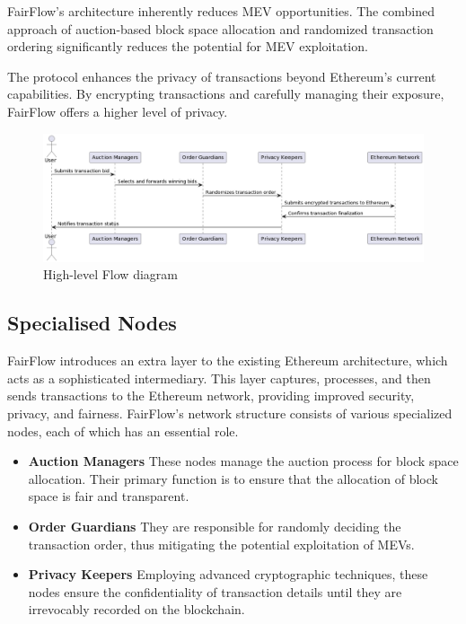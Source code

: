 \documentclass{article}
\begin{document}
FairFlow's architecture inherently reduces MEV opportunities. The combined approach of auction-based block space allocation and randomized transaction ordering significantly reduces the potential for MEV exploitation.

The protocol enhances the privacy of transactions beyond Ethereum's current capabilities. By encrypting transactions and carefully managing their exposure, FairFlow offers a higher level of privacy.

\begin{figure}[h]
    \centering
    \includegraphics[width=0.8\linewidth]{diagram_freeflow_3.png}
    \caption{High-level Flow diagram}
    \label{fig:enter-label}
\end{figure}

\subsection{Specialised Nodes}

FairFlow introduces an extra layer to the existing Ethereum architecture, which acts as a sophisticated intermediary. This layer captures, processes, and then sends transactions to the Ethereum network, providing improved security, privacy, and fairness. FairFlow's network structure consists of various specialized nodes, each of which has an essential role.

\begin{itemize}
    \item \textbf{Auction Managers} These nodes manage the auction process for block space allocation. Their primary function is to ensure that the allocation of block space is fair and transparent.
    \item \textbf{Order Guardians} They are responsible for randomly deciding the transaction order, thus mitigating the potential exploitation of MEVs.
    \item \textbf{Privacy Keepers} Employing advanced cryptographic techniques, these nodes ensure the confidentiality of transaction details until they are irrevocably recorded on the blockchain.
\end{itemize}
\end{document}
